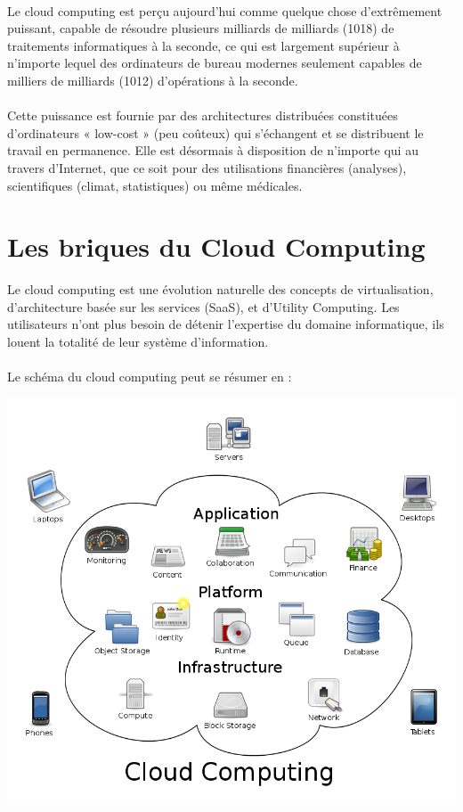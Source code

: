 \documentclass[a4paper,12pt]{report}
\begin{document}
\begin{onehalfspace}
	\paragraph*{}
	Le cloud computing est perçu aujourd'hui comme quelque chose d'extrêmement puissant, capable de résoudre plusieurs milliards de milliards (1018) de traitements informatiques à la seconde, ce qui est largement supérieur à n'importe lequel des ordinateurs de bureau modernes seulement capables de milliers de milliards (1012) d'opérations à la seconde.
	
	\paragraph*{}
	Cette puissance est fournie par des architectures distribuées constituées d'ordinateurs « low-cost » (peu coûteux) qui s'échangent et se distribuent le travail en permanence. Elle est désormais à disposition de n'importe qui au travers d'Internet, que ce soit pour des utilisations financières (analyses), scientifiques (climat, statistiques) ou même médicales.
	

	\section{Les briques du Cloud Computing}

	Le cloud computing est une évolution naturelle des concepts de virtualisation, d’architecture basée sur les services (SaaS), et d’Utility Computing. Les utilisateurs n’ont plus besoin de détenir l’expertise du domaine informatique, ils louent la totalité de leur système d’information.

	\paragraph*{}
	Le schéma du cloud computing peut se résumer en :
	
	\begin{center}
		\includegraphics[width=15cm]{schema_structure.png}
	\end{center}
	

\end{onehalfspace}
\end{document}
